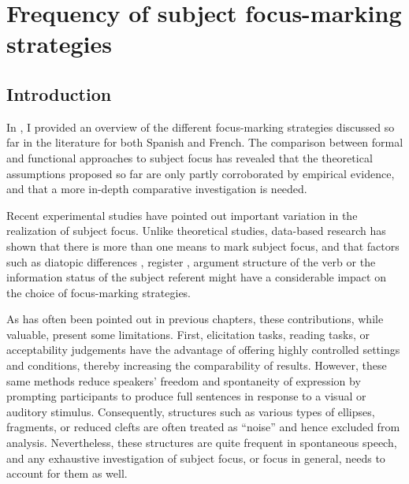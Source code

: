 
\chapter{Frequency of subject focus-marking strategies}\label{sec:3}
\section{Introduction}
In , I provided an overview of the different focus-marking strategies discussed so far in the literature for both Spanish and French. The comparison between formal and functional approaches to subject focus has revealed that the theoretical assumptions proposed so far  are only partly corroborated by empirical evidence, and that a more in-depth comparative investigation is needed.

Recent experimental studies have pointed out important variation in the realization of subject focus. Unlike theoretical studies, data-based research has shown that there is more than one means to mark subject focus, and that factors such as diatopic differences \parencite{jimenez2015focus}, register \parencite{destruel2016focus}, argument structure of the verb \parencite{gabriel2007fokus} or the information status of the subject referent \parencite{Karssenberg+2018} might have a considerable impact on the choice of focus-marking strategies.

As has often been pointed out in previous chapters, these contributions, while valuable, present some limitations. First, elicitation tasks, reading tasks, or acceptability judgements have the advantage of offering highly controlled settings and conditions, thereby increasing the comparability of results. However, these same methods reduce speakers' freedom and spontaneity of expression by prompting participants to produce full sentences in response to a visual or auditory stimulus. Consequently, structures such as various types of ellipses, fragments, or reduced clefts are often treated as ``noise” and hence excluded from analysis. Nevertheless, these structures are quite frequent in spontaneous speech, and any exhaustive investigation of subject focus, or focus in general, needs to account for them as well.

